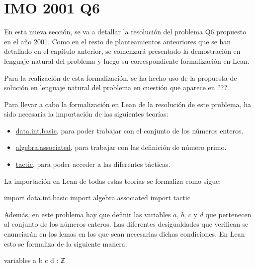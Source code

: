 \section{IMO 2001 Q6}

En esta nueva sección, se va a detallar la resolución del problema Q6
propuesto en el año 2001. Como en el resto de planteamientos anteoriores
que se han detallado en el capítulo anterior, se comenzará presentado la
demostración en lenguaje natural del problema y luego su correspondiente
formalización en Lean.

Para la realización de esta formalización, se ha hecho uso de la propuesta de
solución en lenguaje natural del problema en cuestión que aparece en ???.

\noindent
{}

Para llevar a cabo la formalización en Lean de la resolución de este
problema, ha sido necesaria la importación de las siguientes teorías:
\begin{itemize}
\item \href{https://github.com/leanprover-community/mathlib/blob/master/src/data/int/basic.lean}{data.int.basic}, para poder trabajar con el conjunto
  de los números enteros.
\item \href{https://github.com/leanprover-community/mathlib/blob/master/src/algebra/associated.lean}{algebra.associated}, para trabajar con las
  definición de número primo.
\item \href{https://github.com/leanprover-community/mathlib/tree/master/src/tactic}{tactic}, para poder acceder a las diferentes tácticas.
\end{itemize}

La importación en Lean de todas estas teorías se formaliza como sigue:
\begin{leancode}
import data.int.basic
import algebra.associated
import tactic
\end{leancode}

Además, en este problema hay que definir las variables \(a\), \(b\), \(c\) y
\(d\) que pertenecen al conjunto de los números enteros. Las diferentes
desigualdades que verifican se enunciarán en los lemas en los que sean
necesarias dichas condiciones. En Lean esto se formaliza de la siguiente
manera:
\begin{leancode}
variables {a b c d : ℤ}
\end{leancode}

